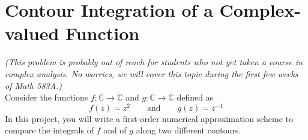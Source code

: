 \section{Contour Integration of a Complex-valued Function}
\textit{(This problem is probably out of reach for students who not yet taken a course in complex analysis. No worries, we will cover this topic during the first few weeks of Math 583A.)}\\

\noindent Consider the functions $f:\mathbb{C} \to \mathbb{C}$ and $g:\mathbb{C} \to \mathbb{C}$ defined as
\begin{equation*}
f(z) = z^2 \quad \quad \text{and} \quad \quad g(z) = z^{-1}
\end{equation*}
In this project, you will write a first-order numerical approximation scheme to compare the integrals of $f$ and of $g$ along two different contours.
